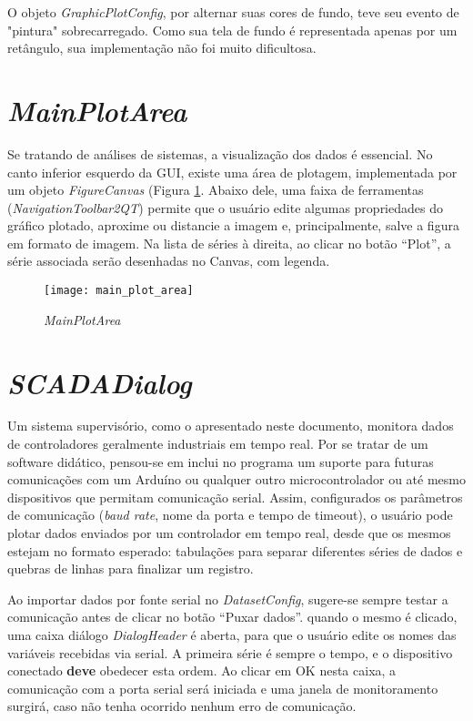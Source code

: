 O objeto \emph{GraphicPlotConfig}, por alternar suas cores de fundo, teve seu evento de "pintura" sobrecarregado. Como sua tela de fundo é representada apenas por um retângulo, sua implementação não foi muito dificultosa.

\section{\emph{MainPlotArea}}

Se tratando de análises de sistemas, a visualização dos dados é essencial. No canto inferior esquerdo da GUI, existe uma área de plotagem, implementada por um objeto \emph{FigureCanvas} (Figura \ref{img_main_plot_area}. Abaixo dele, uma faixa de ferramentas (\emph{NavigationToolbar2QT}) permite que o usuário edite algumas propriedades do gráfico plotado, aproxime ou distancie a imagem e, principalmente, salve a figura em formato de imagem. Na lista de séries à direita, ao clicar no botão “Plot”, a série associada serão desenhadas no Canvas, com legenda.

\begin{figure}[htb]
	\centering
	\texttt{[image: main\_plot\_area]}
	\caption{\emph{MainPlotArea}}
	\label{img_main_plot_area}
\end{figure}

\section{\emph{SCADADialog}}

Um sistema supervisório, como o apresentado neste documento, monitora dados de controladores geralmente industriais em tempo real. Por se tratar de um software didático, pensou-se em inclui no programa um suporte para futuras comunicações com um Arduíno ou qualquer outro microcontrolador ou até mesmo dispositivos que permitam comunicação serial. Assim, configurados os parâmetros de comunicação (\emph{baud rate}, nome da porta e tempo de timeout), o usuário pode plotar dados enviados por um controlador em tempo real, desde que os mesmos estejam no formato esperado: tabulações para separar diferentes séries de dados e quebras de linhas para finalizar um registro.

Ao importar dados por fonte serial no \emph{DatasetConfig}, sugere-se sempre testar a comunicação antes de clicar no botão “Puxar dados”. quando o mesmo é clicado, uma caixa diálogo \emph{DialogHeader} é aberta, para que o usuário edite os nomes das variáveis recebidas via serial. A primeira série é sempre o tempo, e o dispositivo conectado \textbf{deve} obedecer esta ordem. Ao clicar em OK nesta caixa, a comunicação com a porta serial será iniciada e uma janela de monitoramento surgirá, caso não tenha ocorrido nenhum erro de comunicação.

